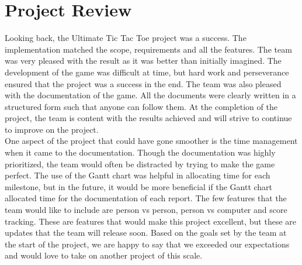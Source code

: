 \documentclass{article}
\begin{document}
\section{Project Review}
	Looking back, the Ultimate Tic Tac Toe project was a success. The implementation matched
the scope, requirements and all the features. The team was very pleased with the result as it was better
than initially imagined. The development of the game was difficult at time, but hard work and
perseverance ensured that the project was a success in the end. The team was also pleased with the
documentation of the game. All the documents were clearly written in a structured form such that anyone
can follow them. At the completion of the project, the team is content with the results achieved and will
strive to continue to improve on the project.\\
	One aspect of the project that could have gone smoother is the time management when it came
to the documentation. Though the documentation was highly prioritized, the team would often be
distracted by trying to make the game perfect. The use of the Gantt chart was helpful in allocating time for each milestone, but in the future, it would be more beneficial if the Gantt chart allocated time for the 
documentation of each report.
	The few features that the team would like to include are person vs person, person vs computer
and score tracking. These are features that would make this project excellent, but these are updates 
that the team will release soon. Based on the goals set by the team at the start of the project, we
are happy to say that we exceeded our expectations and would love to take on another project 
of this scale.
\newpage
\end{document}
